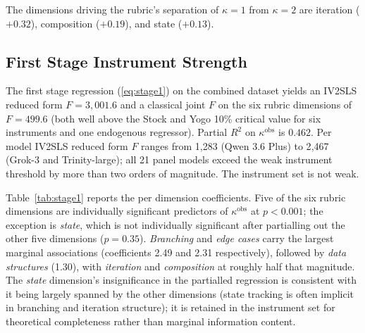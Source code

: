 \documentclass{article}
\begin{document}
The dimensions driving the rubric's separation of $\kappa=1$ from $\kappa=2$ are iteration ($+0.32$), composition ($+0.19$), and state ($+0.13$).

\subsection{First Stage Instrument Strength}

The first stage regression (\ref{eq:stage1}) on the combined dataset yields an IV2SLS reduced form $F=3{,}001.6$ and a classical joint $F$ on the six rubric dimensions of $F=499.6$ (both well above the Stock and Yogo 10\% critical value for six instruments and one endogenous regressor). Partial $R^2$ on $\kappa^{\text{obs}}$ is $0.462$. Per model IV2SLS reduced form $F$ ranges from 1{,}283 (Qwen 3.6 Plus) to 2{,}467 (Grok-3 and Trinity-large); all 21 panel models exceed the weak instrument threshold by more than two orders of magnitude. The instrument set is not weak.

Table~\ref{tab:stage1} reports the per dimension coefficients. Five of the six rubric dimensions are individually significant predictors of $\kappa^{\text{obs}}$ at $p<0.001$; the exception is \emph{state}, which is not individually significant after partialling out the other five dimensions ($p=0.35$). \emph{Branching} and \emph{edge cases} carry the largest marginal associations (coefficients 2.49 and 2.31 respectively), followed by \emph{data structures} (1.30), with \emph{iteration} and \emph{composition} at roughly half that magnitude. The \emph{state} dimension's insignificance in the partialled regression is consistent with it being largely spanned by the other dimensions (state tracking is often implicit in branching and iteration structure); it is retained in the instrument set for theoretical completeness rather than marginal information content.
\end{document}
